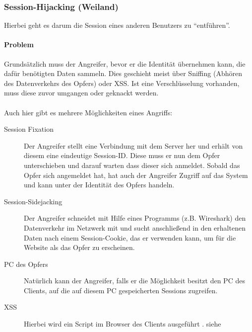 \subsubsection{Session-Hijacking (Weiland)}
\label{sec:content_security_session-hijacking}
Hierbei geht es darum die Session eines anderen Benutzers zu \enquote{entführen}. 
\paragraph{Problem}
Grundsätzlich muss der Angreifer, bevor er die Identität übernehmen kann, die dafür benötigten Daten sammeln. Dies geschieht meist über Sniffing (Abhören des Datenverkehrs des Opfers) oder XSS. Ist eine Verschlüsselung vorhanden, muss diese zuvor umgangen oder geknackt werden.\\\\
Auch hier gibt es mehrere Möglichkeiten eines Angriffs:
\begin{description}
\item[Session Fixation] Der Angreifer stellt eine Verbindung mit dem Server her und erhält von diesem eine eindeutige Session-ID. Diese muss er nun dem Opfer unterschieben und darauf warten dass dieser sich anmeldet. Sobald das Opfer sich angemeldet hat, hat auch der Angreifer Zugriff auf das System und kann unter der Identität des Opfers handeln.
\item[Session-Sidejacking] Der Angreifer schneidet mit Hilfe eines Programms (z.B. Wireshark) den Datenverkehr im Netzwerk mit und sucht anschließend in den erhaltenen Daten nach einem Session-Cookie, das er verwenden kann, um für die Website als das Opfer zu erscheinen.
\item[PC des Opfers] Natürlich kann der Angreifer, falls er die Möglichkeit besitzt den PC des Clients, auf die auf diesem PC gespeicherten Sessions zugreifen.
\item[XSS] Hierbei wird ein Script im Browser des Clients ausgeführt . siehe 
\end{description}

